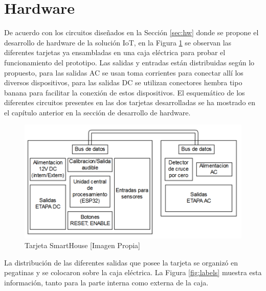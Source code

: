 \section{Hardware}

De acuerdo con los circuitos diseñados en la Sección \ref{sec:hw} donde se propone el desarrollo de hardware de la solución IoT, en la Figura \ref{fig:tarjeta} se observan las diferentes tarjetas ya ensambladas en una caja eléctrica para probar el funcionamiento del prototipo. Las salidas y entradas están distribuidas según lo propuesto, para las salidas AC se usan toma corrientes para conectar allí los diversos dispositivos, para las salidas DC se utilizan conectores hembra tipo banana para facilitar la conexión de estos dispositivos. El esquemático de los diferentes circuitos presentes en las dos tarjetas desarrolladas se ha mostrado en el capítulo anterior en la sección de desarrollo de hardware.\\

\begin{figure}[H]
	\centering
	\caption{Tarjeta SmartHouse [Imagen Propia]}
	\label{fig:tarjeta}
	\includegraphics[width=0.6\linewidth]{Imagenes/Tarjeta}
\end{figure}


La distribución de las diferentes salidas que posee la tarjeta se organizó en pegatinas y se colocaron sobre la caja eléctrica. La Figura \ref{fig:labels} muestra esta información, tanto para la parte interna como externa de la caja.\\

